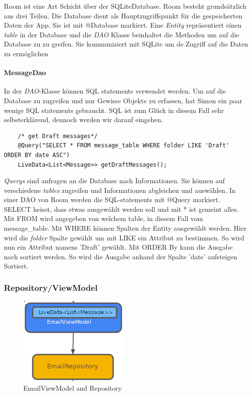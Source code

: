 \documentclass[a4paper,11pt]{article}
\begin{document}
Room ist eine Art Schicht über der SQLiteDatabase. 
Room besteht grundsätzlich aus drei Teilen. Die Database dient als Hauptzugriffspunkt für die gespeicherten Daten der App. Sie ist mit @Database markiert. 
Eine \textit{Entity} repräsentiert einen \textit{table} in der Database und die \textit{DAO} Klasse beinhaltet die Methoden um auf die Database zu zu greifen. Sie kommuniziert
mit SQLite um de Zugriff auf die Daten zu ermöglichen \cite{roomStructure}


\paragraph{MessageDao}

In der \textit{DAO}-Klasse können SQL statements verwendet werden. Um auf die Database zu zugreifen und nur Gewisse 
Objekte zu erfassen, hat Simon ein paar wenige SQL statements gebraucht. SQL ist zum Glück in diesem Fall sehr selbsterklärend, 
dennoch werden wir darauf eingehen.\\


\lstset{language=SQL}
\begin{lstlisting}
    /* get Draft messages*/
    @Query("SELECT * FROM message_table WHERE folder LIKE 'Draft' ORDER BY date ASC")
    LiveData<List<Message>> getDraftMessages();
\end{lstlisting}

\textit{Querys} sind anfragen an die Database nach Informationen. Sie können auf verschiedene \textit{tables} zugreifen und Informationen abgleichen und auswählen. 
In einer DAO von Room werden die SQL-statements mit @Query markiert. SELECT heisst, dass etwas ausgewählt werden soll und mit * ist gemeint alles. Mit FROM wird angegeben von 
welchem table, in diesem Fall vom message\_table. Mit WHERE können Spalten der Entity ausgewählt werden. Hier wird die \textit{folder} Spalte 
gewählt um mit LIKE ein Attribut zu bestimmen. So wird nun ein Attribut namens 'Draft' gewählt. Mit ORDER By kann die Ausgabe noch sortiert werden. So wird die Ausgabe anhand der Spalte 'date'
aufsteigen Sortiert. \cite{queryExpl}

\subsubsection{Repository/ViewModel}

\begingroup
\setlength{\intextsep}{1pt}
\setlength{\columnsep}{4pt}

\begin{figure}
    \centering
    \includegraphics[width=.4\textwidth]{media/ViewModelRepository.png}
    \caption{EmailViewModel and Repository
    \cite{appStructurePicture}}
\end{figure}
\end{document}

